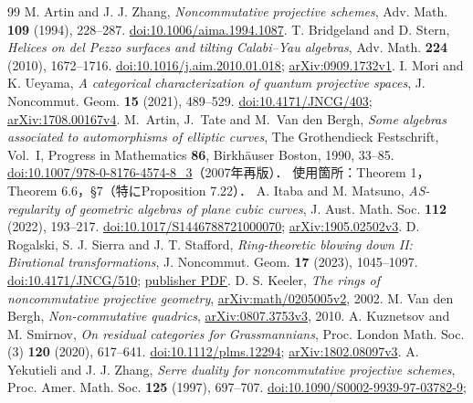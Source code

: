 \documentclass[11pt,a4paper]{ltjsarticle}
\begin{document}
\begin{thebibliography}{99}
 M. Artin and J. J. Zhang,
\emph{Noncommutative projective schemes}, Adv. Math. \textbf{109} (1994), 228--287.
\href{https://doi.org/10.1006/aima.1994.1087}{doi:10.1006/aima.1994.1087}.
 T. Bridgeland and D. Stern,
\emph{Helices on del Pezzo surfaces and tilting Calabi--Yau algebras}, Adv. Math. \textbf{224} (2010), 1672--1716.
\href{https://doi.org/10.1016/j.aim.2010.01.018}{doi:10.1016/j.aim.2010.01.018};
\href{https://arxiv.org/abs/0909.1732}{arXiv:0909.1732v1}.
 I. Mori and K. Ueyama,
\emph{A categorical characterization of quantum projective spaces}, J. Noncommut. Geom. \textbf{15} (2021), 489--529.
\href{https://doi.org/10.4171/JNCG/403}{doi:10.4171/JNCG/403};
\href{https://arxiv.org/abs/1708.00167}{arXiv:1708.00167v4}.
 M.~Artin, J.~Tate and M.~Van den Bergh,
\emph{Some algebras associated to automorphisms of elliptic curves},
The Grothendieck Festschrift, Vol.~I, Progress in Mathematics \textbf{86},
Birkh\"auser Boston, 1990, 33--85.
\href{https://doi.org/10.1007/978-0-8176-4574-8_3}{doi:10.1007/978-0-8176-4574-8\_3}（2007年再版）．
使用箇所：Theorem 1，Theorem 6.6，\S7（特にProposition 7.22）．
 A. Itaba and M. Matsuno,
\emph{AS-regularity of geometric algebras of plane cubic curves}, J. Aust. Math. Soc. \textbf{112} (2022), 193--217.
\href{https://doi.org/10.1017/S1446788721000070}{doi:10.1017/S1446788721000070};
\href{https://arxiv.org/abs/1905.02502}{arXiv:1905.02502v3}.
 D. Rogalski, S. J. Sierra and J. T. Stafford,
\emph{Ring-theoretic blowing down II: Birational transformations}, J. Noncommut. Geom. \textbf{17} (2023), 1045--1097.
\href{https://doi.org/10.4171/JNCG/510}{doi:10.4171/JNCG/510};
\href{https://ems.press/content/serial-article-files/31044}{publisher PDF}.
 D. S. Keeler,
\emph{The rings of noncommutative projective geometry},
\href{https://arxiv.org/abs/math/0205005}{arXiv:math/0205005v2}, 2002.
 M. Van den Bergh,
\emph{Non-commutative quadrics},
\href{https://arxiv.org/abs/0807.3753}{arXiv:0807.3753v3}, 2010.
 A. Kuznetsov and M. Smirnov,
\emph{On residual categories for Grassmannians}, Proc. London Math. Soc. (3)
\textbf{120} (2020), 617--641.
\href{https://doi.org/10.1112/plms.12294}{doi:10.1112/plms.12294};
\href{https://arxiv.org/abs/1802.08097}{arXiv:1802.08097v3}.
 A. Yekutieli and J. J. Zhang,
\emph{Serre duality for noncommutative projective schemes},
Proc. Amer. Math. Soc. \textbf{125} (1997), 697--707.
\href{https://doi.org/10.1090/S0002-9939-97-03782-9}{doi:10.1090/S0002-9939-97-03782-9};

\end{thebibliography}
\end{document}
